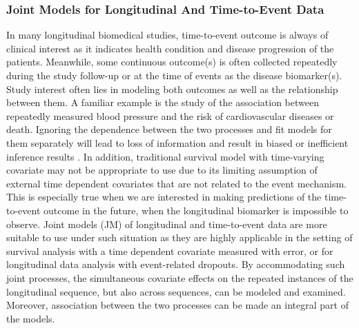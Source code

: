 \subsubsection{Joint Models for Longitudinal And Time-to-Event Data}\label{sec:bak_jm}
In many longitudinal biomedical studies, time-to-event outcome is always of clinical interest as it indicates health condition and disease progression of the patients. Meanwhile, some continuous outcome(s) is often collected repeatedly during the study follow-up or at the time of events as the disease biomarker(s). Study interest often lies in modeling both outcomes as well as the relationship between them. A familiar example is the study of the association between repeatedly measured blood pressure and the risk of cardiovascular diseases or death. Ignoring the dependence between the two processes and fit models for them separately will lead to loss of information and result in biased or inefficient inference results \citep{tsiatis2004joint}. In addition, traditional survival model with time-varying covariate may not be appropriate to use due to its limiting assumption of external time dependent covariates that are not related to the event mechanism. This is especially true when we are interested in making predictions of the time-to-event outcome in the future, when the longitudinal biomarker is impossible to observe. Joint models (JM) of longitudinal and time-to-event data are more suitable to use under such situation as they are highly applicable in the setting of survival analysis with a time dependent covariate measured with error, or for longitudinal data analysis with event-related dropouts\citep{self1992modeling, tsiatis1995modeling}. By accommodating such joint processes, the simultaneous covariate effects on the repeated instances of the longitudinal sequence, but also across sequences, can be modeled and examined. Moreover, association between the two processes can be made an integral part of the models.



